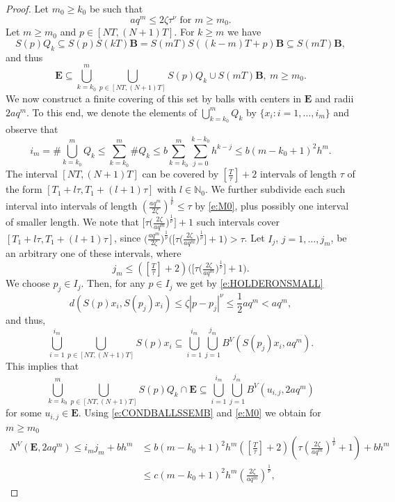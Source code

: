 \documentclass[a4paper,12pt,reqno]{amsart}
\theoremstyle{plain}
\theoremstyle{definition}
\numberwithin{equation}{section}
\newcommand{\N}{\mathbb{N}}
\newcommand{\abs}[1]{\left\vert#1\right\vert}
\renewcommand{\geq}{\geqslant}
\renewcommand{\leq}{\leqslant}
\begin{document}
\begin{proof}
Let $m_0\geq k_0$ be such that
\begin{equation}\label{e:M0}
aq^{m}\leq 2\zeta\tau^{\nu}\text{ for }m\geq m_0.
\end{equation}
Let $m\geq m_0$ and $p\in[NT,(N+1)T]$. For $k\geq m$ we have
$$S(p)Q_k\subseteq S(p)S(kT)\mathbf{B}=S(mT)S((k-m)T+p)\mathbf{B}\subseteq S(mT)\mathbf{B},$$
and thus
$$\mathbf{E}\subseteq\bigcup_{k=k_0}^{m}\bigcup_{p\in[NT,(N+1)T]}S(p)Q_k\cup S(mT)\mathbf{B},\ m\geq m_0.$$
We now construct a finite covering of this set
by balls with centers in $\mathbf{E}$ and radii $2aq^{m}$. 
To this end, we denote the elements of $\displaystyle\bigcup_{k=k_0}^{m}Q_k$ by $\{x_i\colon i=1,\ldots,i_m\}$ and observe that 
$$i_{m}=\# \bigcup_{k=k_0}^{m}Q_k\leq\sum_{k=k_0}^{m}\# Q_k\leq b\sum_{k=k_0}^{m}\sum_{j=0}^{k-k_0}h^{k-j}\leq b(m-k_0+1)^{2}h^{m}.$$
The interval $[NT,(N+1)T]$ can be covered by $\left[\frac{T}{\tau}\right]+2$ intervals of length $\tau$
of the form $[T_1+l\tau,T_1+(l+1)\tau]$ with $l\in\N_0$. 
We further subdivide each such interval into intervals of length
$\left(\frac{aq^{m}}{2\zeta}\right)^{\frac{1}{\nu}}\leq \tau$ 
by \eqref{e:M0}, plus possibly one interval of smaller length. We note that 
$\Big[\tau\Big(\frac{2\zeta}{aq^{m}}\Big)^{\frac{1}{\nu}}\Big]+1$ such intervals cover 
$[T_1+l\tau,T_1+(l+1)\tau]$, since
$\Big(\frac{aq^{m}}{2\zeta}\Big)^{\frac{1}{\nu}}\Big(\Big[\tau\Big(\frac{2\zeta}{aq^{m}}\Big)^{\frac{1}{\nu}}\Big]+1\Big)>\tau$.
Let $I_j$, $j=1,\ldots, j_m$, be an arbitrary one of these intervals, where
$$j_m\leq\left(\left[\tfrac{T}{\tau}\right]+2\right)\Big(\Big[\tau\Big(\tfrac{2\zeta}{aq^{m}}\Big)^{\frac{1}{\nu}}\Big]+1\Big).$$
We choose $p_j\in I_j$. Then, for any $p\in I_j$ we get by \eqref{e:HOLDERONSMALL}
$$d(S(p)x_i,S(p_j)x_i)\leq\zeta\abs{p-p_j}^{\nu}\leq\frac{1}{2}aq^{m}<aq^{m},$$
and thus, 
$$\bigcup_{i=1}^{i_m}\bigcup_{p\in[NT,(N+1)T]}S(p)x_i\subseteq\bigcup_{i=1}^{i_m}\bigcup_{j=1}^{j_m}B^{V}(S(p_j)x_i,aq^{m}).$$
This implies that
$$\bigcup_{k=k_0}^{m}\bigcup_{p\in[NT,(N+1)T]}S(p)Q_k\cap\mathbf{E}\subseteq\bigcup_{i=1}^{i_m}\bigcup_{j=1}^{j_m}B^{V}(u_{i,j},2aq^{m})$$
for some $u_{i,j}\in\mathbf{E}$. Using \eqref{e:CONDBALLSSEMB} and \eqref{e:M0} we obtain for $m\geq m_0$
\begin{equation*}
\begin{split}
N^{V}(\mathbf{E},2aq^{m})\leq i_m j_m+bh^{m}&\leq b(m-k_0+1)^{2}h^{m}\left(\left[\tfrac{T}{\tau}\right]+2\right)\left(\tau\left(\tfrac{2\zeta}{aq^{m}}\right)^{\frac{1}{\nu}}+1\right)+bh^{m}\\
&\leq c(m-k_0+1)^{2}h^{m}\left(\tfrac{2\zeta}{aq^{m}}\right)^{\frac{1}{\nu}},

\end{split}
\end{equation*}
\end{proof}
\end{document}
